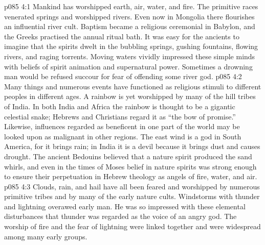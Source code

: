 \vs p085 4:1 Mankind has worshipped earth, air, water, and fire. The primitive races venerated springs and worshipped rivers. Even now in Mongolia there flourishes an influential river cult. Baptism became a religious ceremonial in Babylon, and the Greeks practised the annual ritual bath. It was easy for the ancients to imagine that the spirits dwelt in the bubbling springs, gushing fountains, flowing rivers, and raging torrents. Moving waters vividly impressed these simple minds with beliefs of spirit animation and supernatural power. Sometimes a drowning man would be refused succour for fear of offending some river god.
\vs p085 4:2 Many things and numerous events have functioned as religious stimuli to different peoples in different ages. A rainbow is yet worshipped by many of the hill tribes of India. In both India and Africa the rainbow is thought to be a gigantic celestial snake; Hebrews and Christians regard it as “the bow of promise.” Likewise, influences regarded as beneficent in one part of the world may be looked upon as malignant in other regions. The east wind is a god in South America, for it brings rain; in India it is a devil because it brings dust and causes drought. The ancient Bedouins believed that a nature spirit produced the sand whirls, and even in the times of Moses belief in nature spirits was strong enough to ensure their perpetuation in Hebrew theology as angels of fire, water, and air.
\vs p085 4:3 Clouds, rain, and hail have all been feared and worshipped by numerous primitive tribes and by many of the early nature cults. Windstorms with thunder and lightning overawed early man. He was so impressed with these elemental disturbances that thunder was regarded as the voice of an angry god. The worship of fire and the fear of lightning were linked together and were widespread among many early groups.
